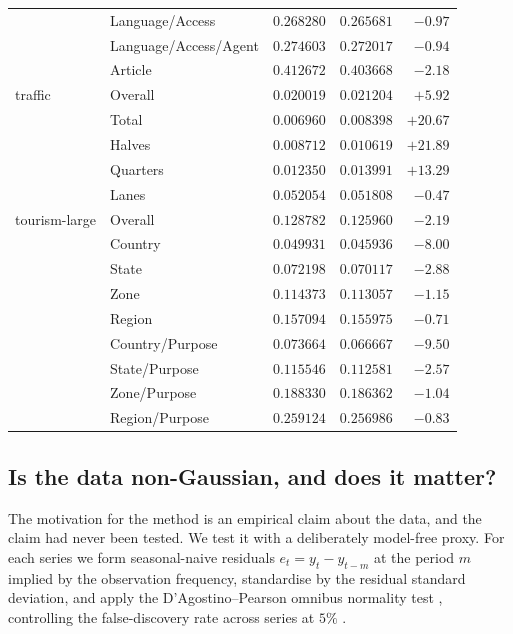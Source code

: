 \documentclass[11pt]{article}
\begin{document}
\begin{table}[t]
\begin{tabular}{llrrr}
       & Language/Access          & $0.268280$ & $0.265681$ & $-0.97$ \\
       & Language/Access/Agent    & $0.274603$ & $0.272017$ & $-0.94$ \\
       & Article                  & $0.412672$ & $0.403668$ & $-2.18$ \\
\midrule
traffic & Overall                 & $0.020019$ & $0.021204$ & $+5.92$ \\
       & Total                    & $0.006960$ & $0.008398$ & $+20.67$ \\
       & Halves                   & $0.008712$ & $0.010619$ & $+21.89$ \\
       & Quarters                 & $0.012350$ & $0.013991$ & $+13.29$ \\
       & Lanes                    & $0.052054$ & $0.051808$ & $-0.47$ \\
\midrule
tourism-large & Overall           & $0.128782$ & $0.125960$ & $-2.19$ \\
       & Country                  & $0.049931$ & $0.045936$ & $-8.00$ \\
       & State                    & $0.072198$ & $0.070117$ & $-2.88$ \\
       & Zone                     & $0.114373$ & $0.113057$ & $-1.15$ \\
       & Region                   & $0.157094$ & $0.155975$ & $-0.71$ \\
       & Country/Purpose          & $0.073664$ & $0.066667$ & $-9.50$ \\
       & State/Purpose            & $0.115546$ & $0.112581$ & $-2.57$ \\
       & Zone/Purpose             & $0.188330$ & $0.186362$ & $-1.04$ \\
       & Region/Purpose           & $0.259124$ & $0.256986$ & $-0.83$ \\
\bottomrule
\end{tabular}
\end{table}

\subsection{Is the data non-Gaussian, and does it matter?}
\label{sec:nongauss}

The motivation for the method is an empirical claim about the data, and the claim had
never been tested. We test it with a deliberately model-free proxy. For each series
we form seasonal-naive residuals $e_t = y_t - y_{t-m}$ at the period $m$ implied by
the observation frequency, standardise by the residual standard deviation, and apply
the D'Agostino--Pearson omnibus normality test \citep{dagostino1973}, controlling the
false-discovery rate across series at $5\%$ \citep{benjamini1995fdr}.
\end{document}
